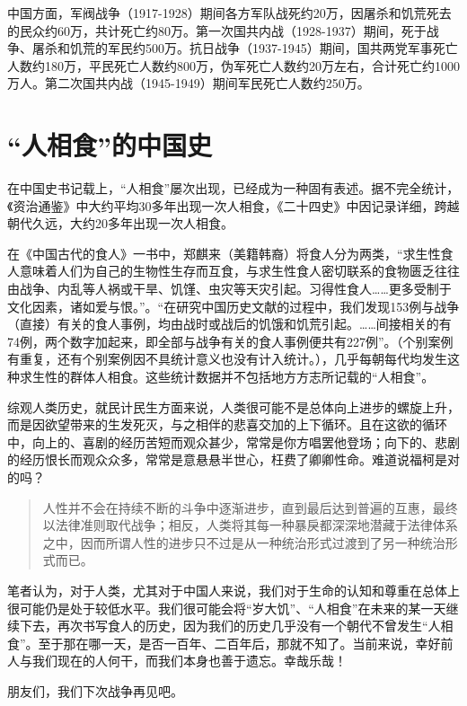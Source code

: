 中国方面，军阀战争（1917-1928）期间各方军队战死约20万，因屠杀和饥荒死去的民众约60万，共计死亡约80万。第一次国共内战（1928-1937）期间，死于战争、屠杀和饥荒的军民约500万。抗日战争（1937-1945）期间，国共两党军事死亡人数约180万，平民死亡人数约800万，伪军死亡人数约20万左右，合计死亡约1000万人。第二次国共内战（1945-1949）期间军民死亡人数约250万。

\section{“人相食”的中国史}

在中国史书记载上，“人相食”屡次出现，已经成为一种固有表述\cite{renxiangshi}。据不完全统计，《资治通鉴》中大约平均30多年出现一次人相食，《二十四史》中因记录详细，跨越朝代久远，大约20多年出现一次人相食。

在《中国古代的食人》一书中，郑麒来（美籍韩裔）将食人分为两类，“求生性食人意味着人们为自己的生物性生存而互食，与求生性食人密切联系的食物匮乏往往由战争、内乱等人祸或干旱、饥馑、虫灾等天灾引起。习得性食人……更多受制于文化因素，诸如爱与恨。”。“在研究中国历史文献的过程中，我们发现153例与战争（直接）有关的食人事例，均由战时或战后的饥饿和饥荒引起。……间接相关的有74例，两个数字加起来，即全部与战争有关的食人事例便共有227例”。（个别案例有重复，还有个别案例因不具统计意义也没有计入统计。），几乎每朝每代均发生这种求生性的群体人相食。这些统计数据并不包括地方方志所记载的“人相食”。

综观人类历史，就民计民生方面来说，人类很可能不是总体向上进步的螺旋上升，而是因欲望带来的生发死灭，与之相伴的悲喜交加的上下循环。且在这欲的循环中，向上的、喜剧的经历苦短而观众甚少，常常是你方唱罢他登场；向下的、悲剧的经历恨长而观众众多，常常是意悬悬半世心，枉费了卿卿性命。难道说福柯是对的吗？
\begin{quotation}人性并不会在持续不断的斗争中逐渐进步，直到最后达到普遍的互惠，最终以法律准则取代战争；相反，人类将其每一种暴戾都深深地潜藏于法律体系之中，因而所谓人性的进步只不过是从一种统治形式过渡到了另一种统治形式而已。
\end{quotation}


笔者认为，对于人类，尤其对于中国人来说，我们对于生命的认知和尊重在总体上很可能仍是处于较低水平。我们很可能会将“岁大饥”、“人相食”在未来的某一天继续下去，再次书写食人的历史，因为我们的历史几乎没有一个朝代不曾发生“人相食”。至于那在哪一天，是否一百年、二百年后，那就不知了。当前来说，幸好前人与我们现在的人何干，而我们本身也善于遗忘。幸哉乐哉！\bigskip


朋友们，我们下次战争再见吧。

